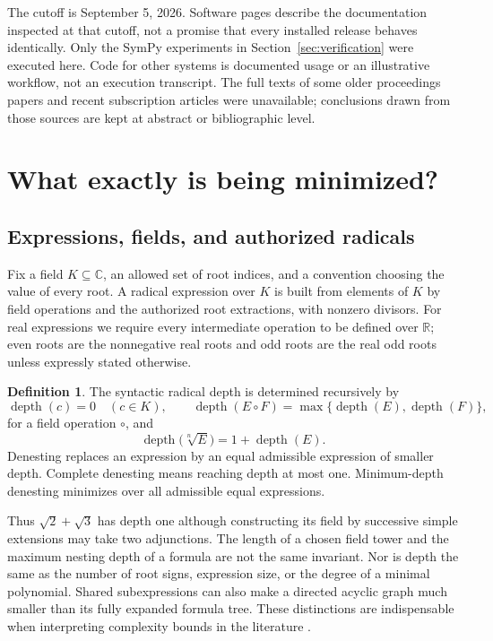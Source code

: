 \documentclass[11pt,oneside]{article}
\numberwithin{equation}{section}
\theoremstyle{definition}
\newtheorem{definition}[theorem]{Definition}
\theoremstyle{remark}
\newcommand{\R}{\mathbb{R}}
\newcommand{\C}{\mathbb{C}}
\newcommand{\depth}{\operatorname{depth}}
\begin{document}
The cutoff is September 5, 2026. Software pages describe the documentation inspected at that cutoff, not a promise that every installed release behaves identically. Only the SymPy experiments in Section~\ref{sec:verification} were executed here. Code for other systems is documented usage or an illustrative workflow, not an execution transcript. The full texts of some older proceedings papers and recent subscription articles were unavailable; conclusions drawn from those sources are kept at abstract or bibliographic level.

\section{What exactly is being minimized?}\label{sec:definitions}

\subsection{Expressions, fields, and authorized radicals}
Fix a field $K\subseteq\C$, an allowed set of root indices, and a convention choosing the value of every root. A radical expression over $K$ is built from elements of $K$ by field operations and the authorized root extractions, with nonzero divisors. For real expressions we require every intermediate operation to be defined over $\R$; even roots are the nonnegative real roots and odd roots are the real odd roots unless expressly stated otherwise.

\begin{definition}
The syntactic radical depth is determined recursively by
\[
\depth(c)=0\quad(c\in K),\qquad
\depth(E\mathbin{\circ}F)=\max\{\depth(E),\depth(F)\},
\]
for a field operation $\circ$, and
\[
\depth\bigl(\sqrt[n]{E}\bigr)=1+\depth(E).
\]
Denesting replaces an expression by an equal admissible expression of smaller depth. Complete denesting means reaching depth at most one. Minimum-depth denesting minimizes over all admissible equal expressions.
\end{definition}

Thus $\sqrt2+\sqrt3$ has depth one although constructing its field by successive simple extensions may take two adjunctions. The length of a chosen field tower and the maximum nesting depth of a formula are not the same invariant. Nor is depth the same as the number of root signs, expression size, or the degree of a minimal polynomial. Shared subexpressions can also make a directed acyclic graph much smaller than its fully expanded formula tree. These distinctions are indispensable when interpreting complexity bounds in the literature \cite{bfht,blomerthesis,jeffrey}.
\end{document}

